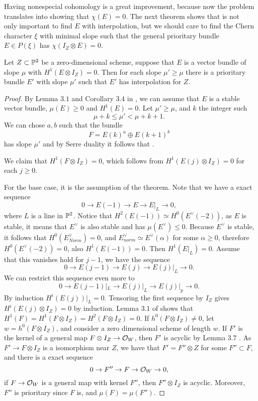 \documentclass[
	oldfontcommands,
	sumario=abnt-6027-2012,
	12pt,			%
	openright,		%
	oneside,		%
	a4paper,		%
	english,		%
	brazil			%
	]{imecc-unicamp}
\begin{document}
Having nonespecial cohomology is a great improvement, because now the problem translates into showing that $\chi(E)=0$. The next theorem shows that is not only important to find $E$ with interpolation, but we should care to find the Chern character $\xi$ with minimal slope such that the general prioritary bundle $E\in P(\xi)$ has $\chi(I_Z\otimes E)=0$. 
\begin{teorema}\label{bigger slope theorem}
	Let $Z\subset {\mathbb P}^2$ be a zero-dimensional scheme, suppose that $E$ is a vector bundle of slope $\mu$ with $H^1(E\otimes I_Z)=0$. Then for each slope $\mu'\geq \mu$ there is a prioritary bundle $E'$ with slope $\mu'$ such that $E'$ has interpolation for $Z$.  
	
\end{teorema}
\begin{proof}
	By Lemma $3.1$ and Corollary $3.4$ in \cite{COSKUN}, we can assume that $E$ is a stable vector bundle, $\mu(E)\geq 0$ and $H^1(E)=0$. Let $\mu'\geq \mu$, and $k$ the integer such $$
	\mu+k\le\mu'<\mu +k+1.
	$$
	We can chose $a,b$ such that the bundle $$
	F=E(k)^a\oplus E(k+1)^b
	$$
	has slope $\mu'$ and by Serre duality it follows that . 
	
	We claim that $H^1(F\otimes I_Z)=0$, which follows from $H^1(E(j)\otimes I_Z)=0$ for each $j\geq 0$.
	
	For the base case, it is the assumption of the theorem. Note that we have a exact sequence $$
	0\rightarrow E(-1)\rightarrow E\rightarrow E|_L\rightarrow 0,
	$$
	where $L$ is a line in ${\mathbb P}^2$. Notice that  $H^2(E(-1))\simeq H^0(E^\vee(-2))$, as $E$ is stable, it means that $E^\vee$ is also stable and has $\mu(E^\vee)\le 0$. Because $E^\vee$ is stable, it follows that $H^0(E^\vee_{Norm})=0$, and $E^\vee_{norm}\simeq E^\vee(\alpha)$ for some $\alpha\geq0$, therefore $H^0(E^\vee(-2))=0$, also $H^1(E(-1))=0$. Then $H^1(E|_L)=0$. Assume that this vanishes hold for $j-1$, we have the sequence $$
	0\rightarrow E(j-1)\rightarrow E(j)\rightarrow E(j)|_L\rightarrow 0.
	$$
	We can restrict this sequence even more to $$
	0\rightarrow E(j-1)|_L\rightarrow E(j)|_L\rightarrow E(j)|_p\rightarrow 0.
	$$
	By induction $H^i(E(j))|_L=0$. Tensoring the first sequence by $I_Z$ gives $H^i(E(j)\otimes I_Z)=0$ by induction. Lemma $3.1$ of \cite{COSKUN} shows that $H^1(F)=H^1(F\otimes I_Z)=H^2(F\otimes I_Z)=0$. If $h^0(F\otimes I_Z)\neq 0$, let $w=h^0(F\otimes I_Z)$, and consider a zero dimensional scheme of length $w$. If $F'$ is the kernel of a general map $F\otimes I_Z\rightarrow {\mathcal O}_W$, then $F'$ is acyclic by Lemma $3.7$ \cite{COSKUN}. As $F'\rightarrow F\otimes I_Z$ is a isomorphism near $Z$, we have that $F'=F''\otimes Z$ for some $F''\subset F$, and there is a exact sequence $$
	0\rightarrow F''\rightarrow F\rightarrow {\mathcal O}_W\rightarrow 0,
	$$
	if $F\rightarrow {\mathcal O}_W$ is a general map with kernel $F''$, then $F''\otimes I_Z$ is acyclic. Moreover, $F''$ is prioritary since $F$ is, and $\mu(F)=\mu(F'')$.
	
\end{proof}
\end{document}
